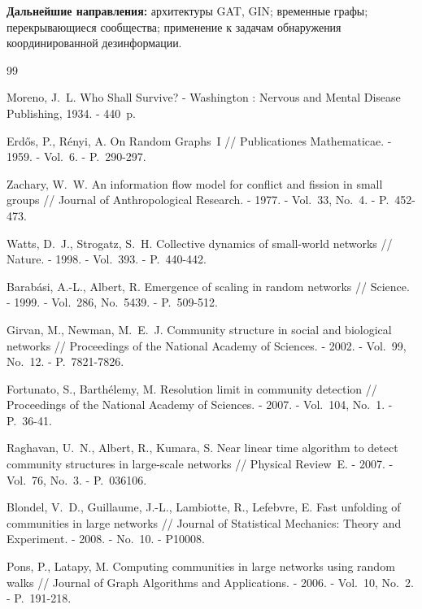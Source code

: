 \documentclass[14pt,a4paper]{extarticle}
\begin{document}
\textbf{Дальнейшие направления:} архитектуры GAT, GIN; временные графы; перекрывающиеся сообщества; применение к задачам обнаружения координированной дезинформации.

\begin{thebibliography}{99}

Moreno, J.~L. Who Shall Survive? - Washington : Nervous and Mental Disease Publishing, 1934. - 440~p.

Erdős, P., Rényi, A. On Random Graphs~I // Publicationes Mathematicae. - 1959. - Vol.~6. - P.~290-297.

Zachary, W.~W. An information flow model for conflict and fission in small groups // Journal of Anthropological Research. - 1977. - Vol.~33, No.~4. - P.~452-473.

Watts, D.~J., Strogatz, S.~H. Collective dynamics of small-world networks // Nature. - 1998. - Vol.~393. - P.~440-442.

Barabási, A.-L., Albert, R. Emergence of scaling in random networks // Science. - 1999. - Vol.~286, No.~5439. - P.~509-512.

Girvan, M., Newman, M.~E.~J. Community structure in social and biological networks // Proceedings of the National Academy of Sciences. - 2002. - Vol.~99, No.~12. - P.~7821-7826.

Fortunato, S., Barthélemy, M. Resolution limit in community detection // Proceedings of the National Academy of Sciences. - 2007. - Vol.~104, No.~1. - P.~36-41.

Raghavan, U.~N., Albert, R., Kumara, S. Near linear time algorithm to detect community structures in large-scale networks // Physical Review~E. - 2007. - Vol.~76, No.~3. - P.~036106.

Blondel, V.~D., Guillaume, J.-L., Lambiotte, R., Lefebvre, E. Fast unfolding of communities in large networks // Journal of Statistical Mechanics: Theory and Experiment. - 2008. - No.~10. - P10008.

Pons, P., Latapy, M. Computing communities in large networks using random walks // Journal of Graph Algorithms and Applications. - 2006. - Vol.~10, No.~2. - P.~191-218.


\end{thebibliography}
\end{document}
